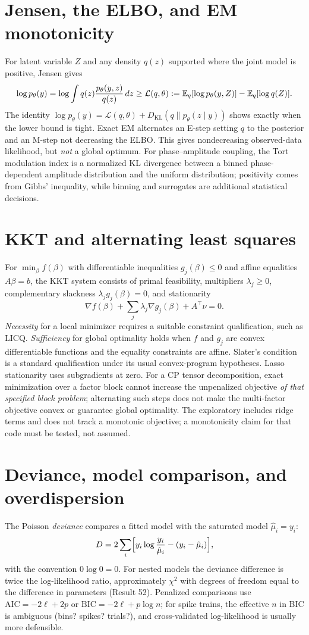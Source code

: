 \section{Jensen, the ELBO, and EM monotonicity}
For latent variable $Z$ and any density $q(z)$ supported
where the joint model is positive, Jensen gives
\[
\log p_\theta(y)
=\log\int q(z)\frac{p_\theta(y,z)}{q(z)}\,dz
\ge \mathcal L(q,\theta)
:=\mathbb{E}_q[\log p_\theta(y,Z)]-\mathbb{E}_q[\log q(Z)].
\]
The identity
$\log p_\theta(y)=\mathcal L(q,\theta)
 +D_{\mathrm{KL}}(q\|p_\theta(z\mid y))$
shows exactly when the lower bound is tight.
Exact EM alternates an E-step setting $q$ to the posterior and
an M-step not decreasing the ELBO. This gives nondecreasing
observed-data likelihood, but \emph{not} a global optimum.
For phase--amplitude coupling, the Tort modulation index is
a normalized KL divergence between a binned phase-dependent
amplitude distribution and the uniform distribution; positivity
comes from Gibbs' inequality, while binning and surrogates
are additional statistical decisions.

\section{KKT and alternating least squares}
For $\min_\beta f(\beta)$ with differentiable inequalities
$g_j(\beta)\le0$ and affine equalities $A\beta=b$,
the KKT system consists of primal feasibility,
multipliers $\lambda_j\ge0$, complementary slackness
$\lambda_jg_j(\beta)=0$, and stationarity
\[
\nabla f(\beta)+\sum_j\lambda_j\nabla g_j(\beta)+A^\top\nu=0.
\]
\emph{Necessity} for a local minimizer requires a suitable
constraint qualification, such as LICQ.
\emph{Sufficiency} for global optimality holds when
$f$ and $g_j$ are convex differentiable functions and
the equality constraints are affine.
Slater's condition is a standard qualification under its
usual convex-program hypotheses. Lasso stationarity uses
subgradients at zero.
For a CP tensor decomposition, exact minimization over a factor
block cannot increase the unpenalized objective \emph{of that
specified block problem}; alternating such steps does not
make the multi-factor objective convex or guarantee global
optimality. The exploratory 
includes ridge terms and does not track a monotonic objective;
a monotonicity claim for that code must be tested, not assumed.
\section{Deviance, model comparison, and overdispersion}
The Poisson \emph{deviance} compares a fitted model with the saturated
model $\hat\mu_i=y_i$:
\[
D=2\sum_i\Bigl[y_i\log\frac{y_i}{\hat\mu_i}-(y_i-\hat\mu_i)\Bigr],
\]
with the convention $0\log0=0$. For nested models the deviance
difference is twice the log-likelihood ratio, approximately $\chi^2$
with degrees of freedom equal to the difference in parameters
(Result 52). Penalized comparisons use $\mathrm{AIC}=-2\ell+2p$ or
$\mathrm{BIC}=-2\ell+p\log n$; for spike trains, the effective $n$ in
BIC is ambiguous (bins? spikes? trials?), and cross-validated
log-likelihood is usually more defensible.

